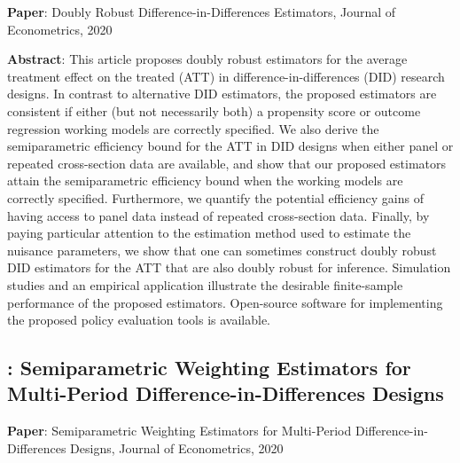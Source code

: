 \documentclass[12pt]{article}
\theoremstyle{definition}
\begin{document}
{\bf Paper}: Doubly Robust Difference-in-Differences Estimators, Journal of Econometrics, 2020

{\bf Abstract}: This article proposes doubly robust estimators for the average treatment effect on the treated (ATT) in difference-in-differences (DID) research designs. In contrast to alternative DID estimators, the proposed estimators are consistent if either (but not necessarily both) a propensity score or outcome regression working models are correctly specified. We also derive the semiparametric efficiency bound for the ATT in DID designs when either panel or repeated cross-section data are available, and show that our proposed estimators attain the semiparametric efficiency bound when the working models are correctly specified. Furthermore, we quantify the potential efficiency gains of having access to panel data instead of repeated cross-section data. Finally, by paying particular attention to the estimation method used to estimate the nuisance parameters, we show that one can sometimes construct doubly robust DID estimators for the ATT that are also doubly robust for inference. Simulation studies and an empirical application illustrate the desirable finite-sample performance of the proposed estimators. Open-source software for implementing the proposed policy evaluation tools is available.

\subsection{\citet{strezhnevSemiparametricWeightingEstimators2018}: Semiparametric Weighting Estimators for Multi-Period Difference-in-Differences Designs}

{\bf Paper}: Semiparametric Weighting Estimators for Multi-Period Difference-in-Differences Designs, Journal of Econometrics, 2020
\end{document}
